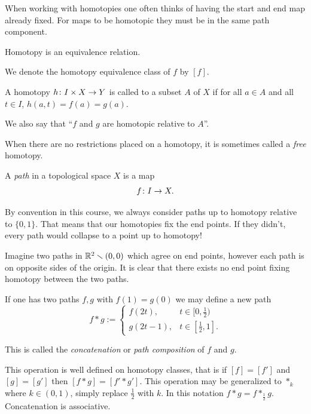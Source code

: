 \documentclass[11pt,leqno,oneside]{amsart}
\numberwithin{thm}{section}
\renewcommand{\setminus}{\smallsetminus}
\newcommand{\x}{\times}
\begin{document}
When working with homotopies one often thinks of having the start and
end map already fixed. For maps to be homotopic they must be in the
same path component.

\begin{prop}
  Homotopy is an equivalence relation.
\end{prop}

We denote the homotopy equivalence class of \(f\) by \([f]\).

\begin{defn}
  A homotopy $h\from I \x X \to Y$ is called  to a subset $A$ of $X$ if for all $a \in A$ and all $t \in I$, $h(a, t) = f(a) = g(a)$.

  We also say that ``$f$ and $g$ are homotopic relative to $A$''.
\end{defn}

When there are no restrictions placed on a homotopy, it is sometimes called a \emph{free} homotopy.

\begin{defn}
  A \emph{path} in a topological space $X$ is a map
  \[f \colon I \to X.\]
\end{defn}

By convention in this course, we always consider paths up to homotopy relative to $\{0, 1\}$.  That means that our homotopies fix the end points.  If they didn't, every path would collapse to a point up to homotopy!

Imagine two paths in \(\R^2 \setminus (0,0)\) which agree on end points,
however each path is on opposite sides of the origin. It is clear that
there exists no end point fixing homotopy between the two paths.

\begin{defn}
  If one has two paths \(f,g\) with \(f(1)=g(0)\) we may define a new
  path
  \[f * g :=
    \begin{cases}
      f(2t), & t \in [0,\frac{1}{2})\\
      g(2t - 1), & t \in [\frac{1}{2},1].
    \end{cases}
  \]

  This is called the \emph{concatenation} or \emph{path composition}
  of $f$ and $g$.

  This operation is well defined on homotopy classes, that is if
  \([f]=[f']\) and \([g]=[g']\) then \([f * g] = [f' * g']\). This
  operation may be generalized to \(*_{k}\) where \(k \in (0,1)\),
  simply replace \(\frac{1}{2}\) with \(k\). In this notation
  \(f * g = f *_{\frac{1}{2}} g\). Concatenation is associative.
\end{defn}
\end{document}
